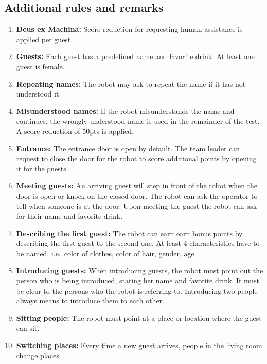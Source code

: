 \subsection*{Additional rules and remarks}
\begin{enumerate}[nosep]
	\item \textbf{Deus ex Machina:} Score reduction for requesting human assistance is applied per guest.

	\item \textbf{Guests:} Each guest has a predefined name and favorite drink. At least one guest is female.

	\item \textbf{Repeating names:} The robot may ask to repeat the name if it has not understood it.

	\item \textbf{Misunderstood names:} If the robot misunderstands the name and continues, the wrongly understood name is used in the remainder of the test. A score reduction of 50pts is applied.
	
	\item \textbf{Entrance:} The entrance door is open by default. The team leader can request to close the door for the robot to score additional points by opening it for the guests.

	\item \textbf{Meeting guests:} An arriving guest will step in front of the robot when the door is open or knock on the closed door. The robot can ask the operator to tell when someone is at the door. Upon meeting the guest the robot can ask for their name and favorite drink.

	\item \textbf{Describing the first guest:} The robot can earn earn bonus points by describing the first guest to the second one. At least 4 characteristics have to be named, i.e.~color of clothes, color of hair, gender, age.

	\item \textbf{Introducing guests:} When introducing guests, the robot must point out the person who is being introduced, stating her name and favorite drink. It must be clear to the persons who the robot is referring to. Introducing two people always means to introduce them to each other.

	\item \textbf{Sitting people:} The robot must point at a place or location where the guest can sit.

	\item \textbf{Switching places:} Every time a new guest arrives, people in the living room change places.
\end{enumerate}


